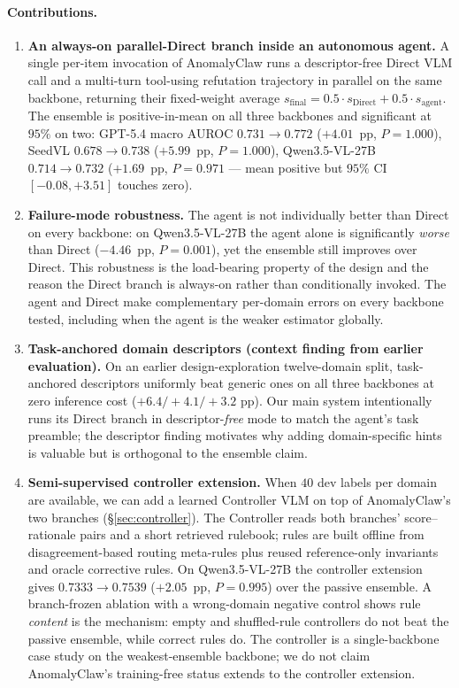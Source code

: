 \paragraph{Contributions.}
\begin{enumerate}
    \item \textbf{An always-on parallel-Direct branch inside an autonomous agent.} A single per-item invocation of AnomalyClaw runs a descriptor-free Direct VLM call and a multi-turn tool-using refutation trajectory in parallel on the same backbone, returning their fixed-weight average $s_{\mathrm{final}}{=}0.5\!\cdot\!s_{\mathrm{Direct}}+0.5\!\cdot\!s_{\mathrm{agent}}$. The ensemble is positive-in-mean on all three backbones and significant at $95\%$ on two: GPT-5.4 macro AUROC $0.731{\to}0.772$ ($+4.01$~pp, $P{=}1.000$), SeedVL $0.678{\to}0.738$ ($+5.99$~pp, $P{=}1.000$), Qwen3.5-VL-27B $0.714{\to}0.732$ ($+1.69$~pp, $P{=}0.971$ --- mean positive but $95\%$ CI $[-0.08,+3.51]$ touches zero).
    \item \textbf{Failure-mode robustness.} The agent is not individually better than Direct on every backbone: on Qwen3.5-VL-27B the agent alone is significantly \emph{worse} than Direct ($-4.46$~pp, $P{=}0.001$), yet the ensemble still improves over Direct. This robustness is the load-bearing property of the design and the reason the Direct branch is always-on rather than conditionally invoked. The agent and Direct make complementary per-domain errors on every backbone tested, including when the agent is the weaker estimator globally.
    \item \textbf{Task-anchored domain descriptors (context finding from earlier evaluation).} On an earlier design-exploration twelve-domain split, task-anchored descriptors uniformly beat generic ones on all three backbones at zero inference cost ($+6.4/+4.1/+3.2$ pp). Our main system intentionally runs its Direct branch in descriptor-\emph{free} mode to match the agent's task preamble; the descriptor finding motivates why adding domain-specific hints is valuable but is orthogonal to the ensemble claim.
    \item \textbf{Semi-supervised controller extension.} When $40$ dev labels per domain are available, we can add a learned Controller VLM on top of AnomalyClaw's two branches (\S\ref{sec:controller}). The Controller reads both branches' score--rationale pairs and a short retrieved rulebook; rules are built offline from disagreement-based routing meta-rules plus reused reference-only invariants and oracle corrective rules. On Qwen3.5-VL-27B the controller extension gives $0.7333{\to}0.7539$ ($+2.05$~pp, $P{=}0.995$) over the passive ensemble. A branch-frozen ablation with a wrong-domain negative control shows rule \emph{content} is the mechanism: empty and shuffled-rule controllers do not beat the passive ensemble, while correct rules do. The controller is a single-backbone case study on the weakest-ensemble backbone; we do not claim AnomalyClaw's training-free status extends to the controller extension.

\end{enumerate}
